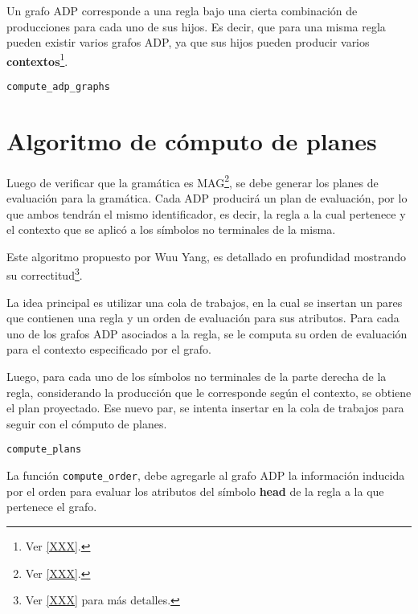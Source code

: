Un grafo ADP corresponde a una regla bajo una cierta combinación de producciones para cada uno de sus hijos. Es decir, que para una misma regla pueden existir varios grafos ADP, ya que sus hijos pueden producir varios \textbf{contextos}\footnote{Ver \ref{XXX}.}.

\begin{algorithm}[H]

\caption{\texttt{compute\_adp\_graphs}}
\end{algorithm}

\section{Algoritmo de cómputo de planes}

Luego de verificar que la gramática es MAG\footnote{Ver \ref{XXX}.}, se debe generar los planes de evaluación para la gramática. Cada ADP producirá un plan de evaluación, por lo que ambos tendrán el mismo identificador, es decir, la regla a la cual pertenece y el contexto que se aplicó a los símbolos no terminales de la misma.

Este algoritmo propuesto por Wuu Yang, es detallado en profundidad mostrando su correctitud\footnote{Ver \ref{XXX} para más detalles.}.

La idea principal es utilizar una cola de trabajos, en la cual se insertan un pares que contienen una regla y un orden de evaluación para sus atributos. Para cada uno de los grafos ADP asociados a la regla, se le computa su orden de evaluación para el contexto especificado por el grafo.

Luego, para cada uno de los símbolos no terminales de la parte derecha de la regla, considerando la producción que le corresponde según el contexto, se obtiene el plan proyectado. Ese nuevo par, se intenta insertar en la cola de trabajos para seguir con el cómputo de planes.

\begin{algorithm}[H]

\caption{\texttt{compute\_plans}}
\end{algorithm}

La función \texttt{compute\_order}, debe agregarle al grafo ADP la información inducida por el orden para evaluar los atributos del símbolo \textbf{head} de la regla a la que pertenece el grafo.

